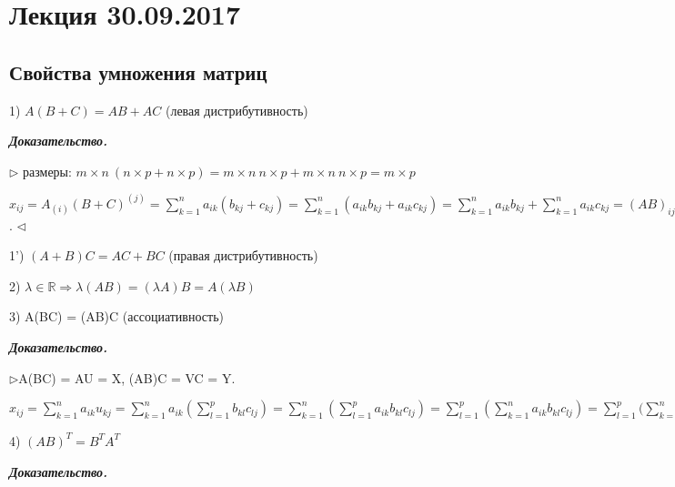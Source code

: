 \section{Лекция 30.09.2017}

\subsection{Свойства умножения матриц}

\vspace{\baselineskip}
1) $A (B + C) = AB + AC$ (левая дистрибутивность)

\vspace{\baselineskip}
\textbf{\textit{Доказательство.}}

$\rhd$ размеры: $m \times n \ ( n \times p + n \times p) = m \times n \ n \times p + m \times n \ n \times p = m \times p$

$x_{ij} = A_{(i)} (B + C)^{(j)} = \sum\limits_{k=1}^n a_{ik} (b_{kj} + c_{kj}) = \sum\limits_{k=1}^n (a_{ik} b_{kj} + a_{ik} c_{kj}) = \sum\limits_{k=1}^n a_{ik} b_{kj} + \sum\limits_{k=1}^n a_{ik} c_{kj} = (AB)_{ij} + (AC)_{ij} = y_{ij} \Rightarrow X = Y$. $\lhd$

\vspace{\baselineskip}
1') $(A + B)C = AC + BC$ (правая дистрибутивность)

\vspace{\baselineskip}
2) $\lambda \in \mathbb{R} \Rightarrow \lambda(AB) = (\lambda A) B = A(\lambda B)$

\vspace{\baselineskip}
3) A(BC) = (AB)C (ассоциативность)

\vspace{\baselineskip}
\textbf{\textit{Доказательство.}}

$\rhd$A(BC) = AU = X, (AB)C = VC = Y.

$x_{ij} = \sum\limits_{k=1}^n a_{ik} u_{kj} = \sum\limits_{k=1}^n a_{ik} (\sum\limits_{l=1}^p b_{kl} c_{lj}) = \sum\limits_{k=1}^n (\sum\limits_{l=1}^p a_{ik} b_{kl} c_{lj}) = \sum\limits_{l=1}^p (\sum\limits_{k=1}^n a_{ik} b_{kl} c_{lj}) = \sum\limits_{l=1}^p(\sum\limits_{k=1}^n (a_{ik} b_{kl}) c_{lj} = \sum\limits_{l=1}^p v_{il} c_{lj} = y_{ij} \Rightarrow X = Y. \lhd $

\vspace{\baselineskip}
4) $(AB)^T = B^T A^T$

\vspace{\baselineskip}
\textbf{\textit{Доказательство.}} 


